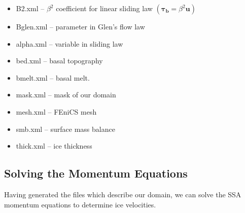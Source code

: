 \documentclass[11pt, reqno, nocenter]{article}
\begin{document}
\begin{itemize}
\item B2.xml -- $\beta^2$ coefficient for linear sliding law $(\bm{\tau_b} = \beta^2 \bm{u})$
\item  Bglen.xml -- parameter in Glen's flow law
\item alpha.xml -- variable in sliding law 
\item bed.xml -- basal topography
\item bmelt.xml -- basal melt. 
\item mask.xml -- mask of our domain
\item mesh.xml -- FEniCS mesh
\item smb.xml -- surface mass balance
\item thick.xml -- ice thickness

\end{itemize}

\subsection{Solving the Momentum Equations}

Having generated the files which describe our domain, we can solve the SSA momentum equations to determine ice velocities. 
\end{document}
